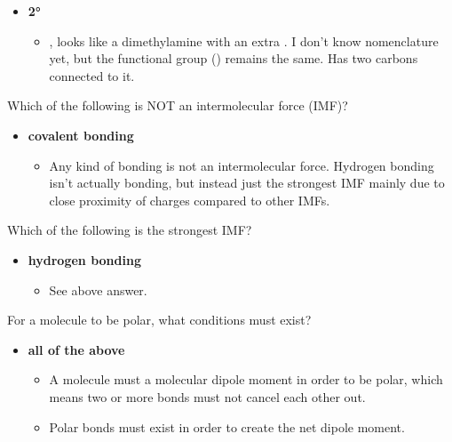 \documentclass[12pt,a4paper]{article}
\begin{document}
\begin{enumerate}
{    \hspace{15pt}
    }
    \begin{itemize}
        \item {\color{o-Sun}\textbf{\ang{2}}}
            \begin{itemize}
                \item {}, looks like a dimethylamine with an extra . I don't know nomenclature yet, but the functional group () remains the same. Has two carbons connected to it.
            \end{itemize}
    \end{itemize}
    {\color{G-Moon}\item Which of the following is NOT an intermolecular force (IMF)?}
        \begin{itemize}
            \item {\color{o-Sun}\textbf{covalent bonding}}
                \begin{itemize}
                    \item Any kind of bonding is not an intermolecular force. Hydrogen bonding isn't actually bonding, but instead just the strongest IMF mainly due to close proximity of charges compared to other IMFs.
                \end{itemize}
        \end{itemize}
    {\color{G-Moon}\item Which of the following is the strongest IMF?}
    \begin{itemize}
        \item {\color{o-Sun}\textbf{hydrogen bonding}}
            \begin{itemize}
                \item See above answer. 
            \end{itemize}
    \end{itemize}
    {\color{G-Moon}\item For a molecule to be polar, what conditions must exist?}
    \begin{itemize}
        \item {\color{o-Sun}\textbf{all of the above}}
            \begin{itemize}
                \item A molecule must a molecular dipole moment in order to be polar, which means two or more bonds must not cancel each other out. 
                \item Polar bonds must exist in order to create the net dipole moment.

\end{itemize}
\end{itemize}
\end{enumerate}
\end{document}

